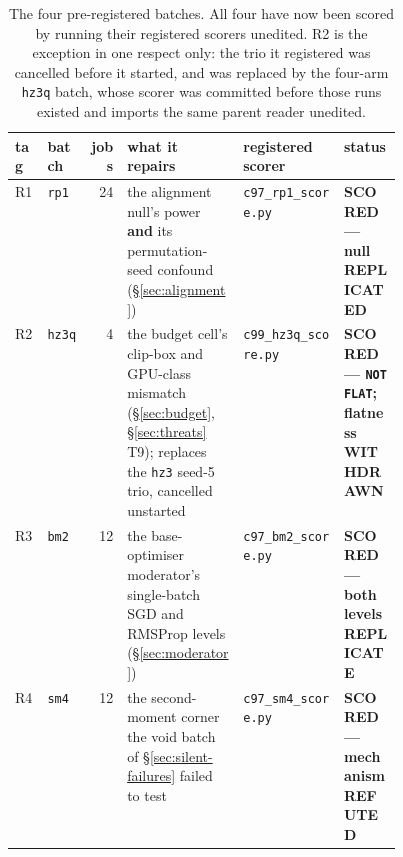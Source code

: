 \documentclass[10pt,letterpaper]{article}
\newcommand{\arm}[1]{\texttt{#1}}
\begin{document}
\begin{table}[htbp]
\centering
\small
\caption{The four pre-registered batches. All four have now been scored by running their
registered scorers unedited. R2 is the exception in one respect only: the trio it registered was
cancelled before it started, and was replaced by the four-arm \arm{hz3q} batch, whose scorer was
committed before those runs existed and imports the same parent reader unedited.}
\label{tab:inflight}
\begin{tabular}{@{}llrp{0.30\linewidth}lp{0.15\linewidth}@{}}
\toprule
tag & batch & jobs & what it repairs & registered scorer & status \\
\midrule
R1 & \arm{rp1} & 24 & the alignment null's power \textbf{and} its permutation-seed confound
     (\S\ref{sec:alignment}) & \texttt{c97\_rp1\_score.py} & \textbf{SCORED --- null
     REPLICATED} \\
R2 & \arm{hz3q} & 4 & the budget cell's clip-box and GPU-class mismatch
     (\S\ref{sec:budget}, \S\ref{sec:threats} T9); replaces the \arm{hz3} seed-5 trio, cancelled
     unstarted & \texttt{c99\_hz3q\_score.py} & \textbf{SCORED --- \texttt{NOT FLAT};
     flatness WITHDRAWN} \\
R3 & \arm{bm2} & 12 & the base-optimiser moderator's single-batch SGD and RMSProp levels
     (\S\ref{sec:moderator}) & \texttt{c97\_bm2\_score.py} & \textbf{SCORED --- both levels
     REPLICATE} \\
R4 & \arm{sm4} & 12 & the second-moment corner the void batch of
     \S\ref{sec:silent-failures} failed to test & \texttt{c97\_sm4\_score.py} &
     \textbf{SCORED --- mechanism REFUTED} \\
\bottomrule
\end{tabular}
\end{table}
\end{document}
